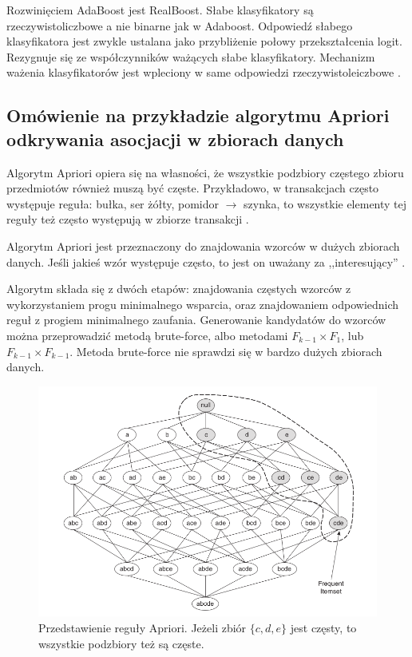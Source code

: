 \documentclass[wi]{zut}
\begin{document}
Rozwinięciem AdaBoost jest RealBoost. Słabe klasyfikatory są rzeczywistoliczbowe a nie binarne jak w Adaboost. Odpowiedź słabego klasyfikatora jest zwykle ustalana jako przybliżenie połowy przekształcenia logit. Rezygnuje się ze współczynników ważących słabe klasyfikatory. Mechanizm ważenia klasyfikatorów jest wpleciony w same odpowiedzi rzeczywistoleiczbowe \cite{Klesk2020}.
\question


\subsection{Omówienie na przykładzie algorytmu Apriori odkrywania asocjacji w zbiorach danych}

Algorytm Apriori opiera się na własności, że wszystkie podzbiory częstego zbioru przedmiotów również muszą być częste. Przykładowo, w transakcjach często występuje reguła: bułka, ser żółty, pomidor $\rightarrow$ szynka, to wszystkie elementy tej reguły też często występują w zbiorze transakcji \cite{Kolodziejczyk2020}.

Algorytm Apriori jest przeznaczony do znajdowania wzorców w dużych zbiorach danych. Jeśli jakieś wzór występuje często, to jest on uważany za ,,interesujący'' \cite{Kolodziejczyk2020}.

Algorytm składa się z dwóch etapów: znajdowania częstych wzorców z wykorzystaniem progu minimalnego wsparcia, oraz znajdowaniem odpowiednich reguł z progiem minimalnego zaufania. Generowanie kandydatów do wzorców można przeprowadzić metodą brute-force, albo metodami $F_{k-1} \times F_1$, lub $F_{k-1} \times F_{k-1}$. Metoda brute-force nie sprawdzi się w bardzo dużych zbiorach danych.

\begin{figure}[H]
    \centering
    \includegraphics[width=0.5\linewidth]{images/apriori.png}
    \caption{Przedstawienie reguły Apriori. Jeżeli zbiór $\{c, d, e\}$ jest częsty, to wszystkie podzbiory też są częste.}
    \label{fig:apriori}
\end{figure}
\end{document}
